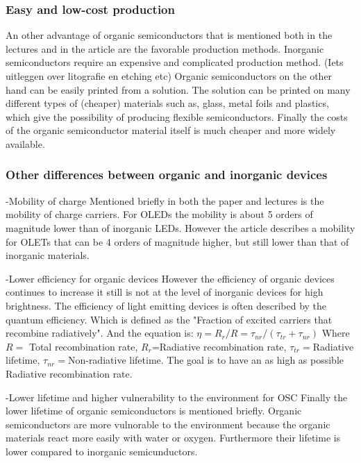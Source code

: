 \subsubsection{Easy and low-cost production}
An other advantage of organic semiconductors that is mentioned both in the lectures and in the article are the favorable production methods. Inorganic semiconductors require an expensive and complicated production method. (Iets uitleggen over litografie en etching etc) Organic semiconductors on the other hand can be easily printed from a solution. The solution can be printed on many different types of (cheaper) materials such as, glass, metal foils and plastics, which give the possibility of producing flexible semiconductors. Finally the costs of the organic semiconductor material itself is much cheaper and more widely available.
\subsubsection{Other differences between organic and inorganic devices}
-Mobility of charge
Mentioned briefly in both the paper and lectures is the mobility of charge carriers. For OLEDs the mobility is about 5 orders of magnitude lower than of inorganic LEDs. However the article describes a mobility for OLETs that can be 4 orders of magnitude higher, but still lower than that of inorganic materials.

-Lower efficiency for organic devices
However the efficiency of organic devices continues to increase it still is not at the level of inorganic devices for high brightness. The efficiency of light emitting devices is often described by the quantum efficiency. Which is defined as the "Fraction of excited carriers that recombine radiatively". And the equation is: $\eta = R_{r}/R = \tau_{nr}/(\tau_{tr}+\tau_{nr})$ Where $R=$ Total recombination rate, $R_{r}$=Radiative recombination rate, $\tau_{tr}=$Radiative lifetime, $\tau_{nr}=$Non-radiative lifetime. The goal is to have an as high as possible Radiative recombination rate. 

-Lower lifetime and higher vulnerability to the environment for OSC
Finally the lower lifetime of organic semiconductors is mentioned briefly. Organic semiconductors are more vulnorable to the environment because the organic materials react more easily with water or oxygen. Furthermore their lifetime is lower compared to inorganic semicunductors. 
